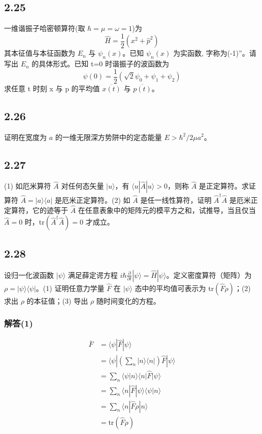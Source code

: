 \subsection{2.25}
一维谐振子哈密顿算符(取 $\hbar = \mu = \omega = 1$)为
$$\hat{H} = \frac{1}{2}(x^2 + \hat{p}^2)$$
其本征值与本征函数为 $E_n$ 与 $\psi_n(x)$。已知 $\psi_n(x)$ 为实函数, 字称为(-1)”。请写出 $E_n$ 的具体形式。已知 t=0 时谐振子的波函数为
$$\psi(0) = \frac{1}{2} \left( \sqrt{2}\psi_0 + \psi_1 + \psi_2 \right)$$
求任意 t 时刻 x 与 p 的平均值 $\overline{x(t)}$ 与 $\overline{p(t)}$。

\subsection{2.26}
证明在宽度为 $a$ 的一维无限深方势阱中的定态能量 $E > \hbar^2 / 2 \mu a^2$。

\subsection{2.27}
(1) 如厄米算符 $\hat{A}$ 对任何态矢量 $|u\rangle$，有 $\langle u|\hat{A}|u\rangle > 0$，则称 $\hat{A}$ 是正定算符。求证算符 $\hat{A} = |a\rangle \langle a|$ 是厄米正定算符。(2) 如 $\hat{A}$ 是任一线性算符，证明 $\hat{A}^{\dagger} \hat{A}$ 是厄米正定算符，它的迹等于 $\hat{A}$ 在任意表象中的矩阵元的模平方之和，试推导，当且仅当 $\hat{A} = 0$ 时，tr$(\hat{A}^{\dagger} \hat{A}) = 0$ 才成立。

\newpage
\subsection{2.28}
设归一化波函数 $|\psi\rangle$ 满足薛定谔方程 $i \hbar \frac{\partial}{\partial t} |\psi\rangle = \hat{H} |\psi\rangle$。定义密度算符（矩阵）为 $\rho = |\psi\rangle \langle \psi|$。(1) 证明任意力学量 $\hat{F}$ 在 $|\psi\rangle$ 态中的平均值可表示为 tr$(\hat{F}\rho)$；(2) 求出 $\rho$ 的本征值；(3) 导出 $\rho$ 随时间变化的方程。

\subsubsection{解答(1)}
\begin{equation}
    \begin{aligned}
        \bar{F}&=\langle \psi |\hat{F}|\psi \rangle 
\\
&=\langle \psi |\left( \sum_n{|n\rangle \langle n|} \right) \hat{F}|\psi \rangle 
\\
&=\sum_n{\langle \psi |n\rangle \langle n|\hat{F}|\psi \rangle}
\\
&=\sum_n{\langle n|\hat{F}|\psi \rangle \langle \psi |n\rangle}
\\
&=\sum_n{\langle n|\hat{F}\rho |n\rangle}
\\
&=\mathrm{tr}\left( \hat{F}\rho \right) 
    \end{aligned}
\end{equation}



